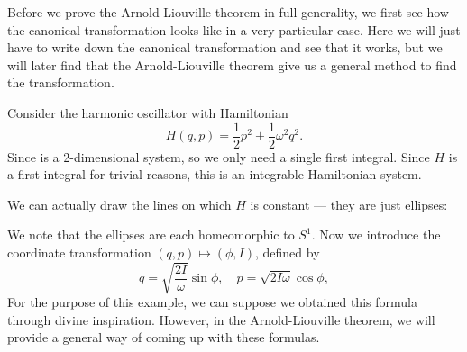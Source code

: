 \documentclass[a4paper]{article}
\begin{document}
Before we prove the Arnold-Liouville theorem in full generality, we first see how the canonical transformation looks like in a very particular case. Here we will just have to write down the canonical transformation and see that it works, but we will later find that the Arnold-Liouville theorem give us a general method to find the transformation.

\begin{eg}
  Consider the harmonic oscillator with Hamiltonian
  \[
    H(q, p) = \frac{1}{2}p^2 + \frac{1}{2}\omega^2 q^2.
  \]
  Since is a 2-dimensional system, so we only need a single first integral. Since $H$ is a first integral for trivial reasons, this is an integrable Hamiltonian system.

  We can actually draw the lines on which $H$ is constant --- they are just ellipses:
  \begin{center}
  \end{center}
  We note that the ellipses are each homeomorphic to $S^1$. Now we introduce the coordinate transformation $(q, p) \mapsto (\phi, I)$, defined by
  \[
    q = \sqrt{\frac{2I}{\omega}} \sin \phi,\quad p = \sqrt{2I\omega} \cos \phi,
  \]
  For the purpose of this example, we can suppose we obtained this formula through divine inspiration. However, in the Arnold-Liouville theorem, we will provide a general way of coming up with these formulas.


\end{eg}
\end{document}

